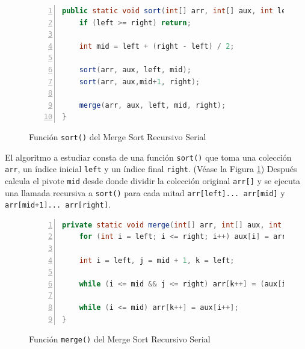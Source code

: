 \documentclass[titlepage]{article}
\begin{document}
\begin{figure}[h]
    \begin{lstlisting}[language=java, frame=single, numbers=left]
public static void sort(int[] arr, int[] aux, int left, int right) {
	if (left >= right) return;
	
	int mid = left + (right - left) / 2;
	
	sort(arr, aux, left, mid);
	sort(arr, aux,mid+1, right);
	
	merge(arr, aux, left, mid, right);
}
    \end{lstlisting}
    \caption{Función \lstinline{sort()} del Merge Sort Recursivo Serial}
    \label{fig:MSRS_sort()}
\end{figure}


El algoritmo a estudiar consta de una función \lstinline|sort()| que toma una colección \lstinline|arr|, un índice inicial \lstinline|left| y un índice final \lstinline|right|. (Véase la Figura \ref{fig:MSRS_sort()}) Después calcula el pivote \lstinline|mid| desde donde dividir la colección original \lstinline|arr[]| y se ejecuta una llamada recursiva a \lstinline{sort()} para cada mitad \lstinline|arr[left]... arr[mid]| y \lstinline|arr[mid+1]... arr[right]|.

\begin{figure}[h]
    \begin{lstlisting}[language=java, frame=single, numbers=left]
private static void merge(int[] arr, int[] aux, int left, int mid, int right) {
	for (int i = left; i <= right; i++) aux[i] = arr[i];
	
	int i = left, j = mid + 1, k = left;
	
	while (i <= mid && j <= right) arr[k++] = (aux[i] <= aux[j])? aux[i++] : aux[j++];
	
	while (i <= mid) arr[k++] = aux[i++];
}
    \end{lstlisting}
    \caption{Función \lstinline{merge()} del Merge Sort Recursivo Serial}
    \label{fig:MSRS_merge()}
\end{figure}
\end{document}
